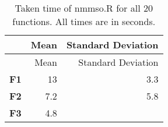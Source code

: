 \documentclass[12pt,a4paper]{article}
\begin{document}
\begin{longtable}[c]{@{}crr@{}}
\caption{Taken time of nmmso.R for all 20 functions. All times are in
seconds.}\tabularnewline
\toprule
\begin{minipage}[b]{0.13\columnwidth}\centering\strut
~
\strut\end{minipage} &
\begin{minipage}[b]{0.09\columnwidth}\raggedleft\strut
Mean
\strut\end{minipage} &
\begin{minipage}[b]{0.25\columnwidth}\raggedleft\strut
Standard Deviation
\strut\end{minipage}\tabularnewline
\midrule
\endfirsthead
\toprule
\begin{minipage}[b]{0.13\columnwidth}\centering\strut
~
\strut\end{minipage} &
\begin{minipage}[b]{0.09\columnwidth}\raggedleft\strut
Mean
\strut\end{minipage} &
\begin{minipage}[b]{0.25\columnwidth}\raggedleft\strut
Standard Deviation
\strut\end{minipage}\tabularnewline
\midrule
\endhead
\begin{minipage}[t]{0.13\columnwidth}\centering\strut
\textbf{F1}
\strut\end{minipage} &
\begin{minipage}[t]{0.09\columnwidth}\raggedleft\strut
13
\strut\end{minipage} &
\begin{minipage}[t]{0.25\columnwidth}\raggedleft\strut
3.3
\strut\end{minipage}\tabularnewline
\begin{minipage}[t]{0.13\columnwidth}\centering\strut
\textbf{F2}
\strut\end{minipage} &
\begin{minipage}[t]{0.09\columnwidth}\raggedleft\strut
7.2
\strut\end{minipage} &
\begin{minipage}[t]{0.25\columnwidth}\raggedleft\strut
5.8
\strut\end{minipage}\tabularnewline
\begin{minipage}[t]{0.13\columnwidth}\centering\strut
\textbf{F3}
\strut\end{minipage} &
\begin{minipage}[t]{0.09\columnwidth}\raggedleft\strut
4.8
\strut\end{minipage} &
\begin{minipage}[t]{0.25\columnwidth}\raggedleft\strut

\end{minipage}
\end{longtable}
\end{document}

